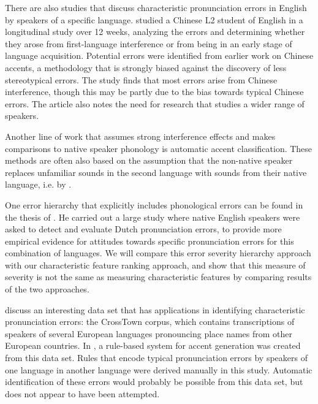 \documentclass[output=paper]{LSP/langsci}
\begin{document}
There are also studies that discuss characteristic pronunciation errors in English by speakers of a specific language. \citet{gao_pronunciation_2005} studied a Chinese L2 student of English in a longitudinal study over 12 weeks, analyzing the errors and determining whether they arose from first-language interference or from being in an early stage of language acquisition. Potential errors were identified from earlier work on Chinese accents, a methodology that is strongly biased against the discovery of less stereotypical errors. The study finds that most errors arise from Chinese interference, though this may be partly due to the bias towards typical Chinese errors. The article also notes the need for research that studies a wider range of speakers.

Another line of work that assumes strong interference effects and makes comparisons to native speaker phonology is automatic accent classification. These methods are often also based on the assumption that the non-native speaker replaces unfamiliar sounds in the second language with sounds from their native language, i.e. by \citet{angkititrakul_advances_2006}.

One error hierarchy that explicitly includes phonological errors can be found in the thesis of \citet{van_den_doel_evaluation_2006}. He carried out a large study where native English speakers were asked to detect and evaluate Dutch pronunciation errors, to provide more empirical evidence for attitudes towards specific pronunciation errors for this combination of languages. We will compare this error severity hierarchy approach with our characteristic feature ranking approach, and show that this measure of severity is not the same as measuring characteristic features by comparing results of the two approaches.

\citet{schaden_casselberveetovallarga_2006} discuss an interesting data set that has applications in identifying characteristic pronunciation errors: the CrossTown corpus, which contains transcriptions of speakers of several European languages pronouncing place names from other European countries. In \citet{schaden_crosstowns_2004}, a rule-based system for accent generation was created from this data set. Rules that encode typical pronunciation errors by speakers of one language in another language were derived manually in this study. Automatic identification of these errors would probably be possible from this data set, but does not appear to have been attempted.
\end{document}
